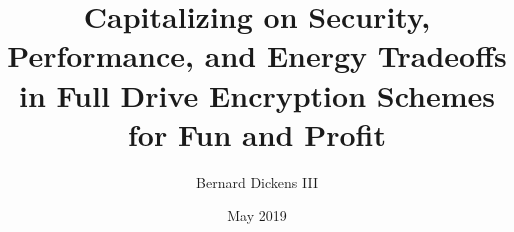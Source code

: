 \documentclass{ucetd}
\title{Capitalizing on Security, Performance, and Energy Tradeoffs in Full Drive Encryption Schemes for Fun and Profit}
\author{Bernard Dickens III}
\date{May 2019}
\begin{document}
\maketitle


\tableofcontents
\listoftables


\abstract


\mainmatter






%
%

\clearpage
\printbibliography
\end{document}
